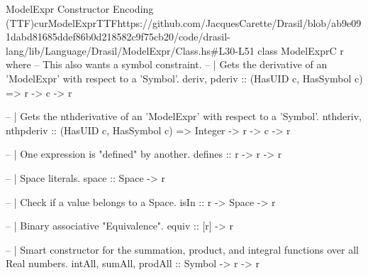 \begin{haskell}{ModelExpr Constructor Encoding (TTF)}{curModelExprTTF}{https://github.com/JacquesCarette/Drasil/blob/ab9e091dabd81685ddef86b0d218582c9f75cb20/code/drasil-lang/lib/Language/Drasil/ModelExpr/Class.hs\#L30-L51}
class ModelExprC r where
  -- This also wants a symbol constraint.
  -- | Gets the derivative of an 'ModelExpr' with respect to a 'Symbol'.
  deriv, pderiv :: (HasUID c, HasSymbol c) => r -> c -> r
  
  -- | Gets the nthderivative of an 'ModelExpr' with respect to a 'Symbol'.
  nthderiv, nthpderiv :: (HasUID c, HasSymbol c) => Integer -> r -> c -> r
  
  -- | One expression is "defined" by another.
  defines :: r -> r -> r
  
  -- | Space literals.
  space :: Space -> r
  
  -- | Check if a value belongs to a Space.
  isIn :: r -> Space -> r
  
  -- | Binary associative "Equivalence".
  equiv :: [r] -> r
  
  -- | Smart constructor for the summation, product, and integral functions over all Real numbers.
  intAll, sumAll, prodAll :: Symbol -> r -> r
\end{haskell}
